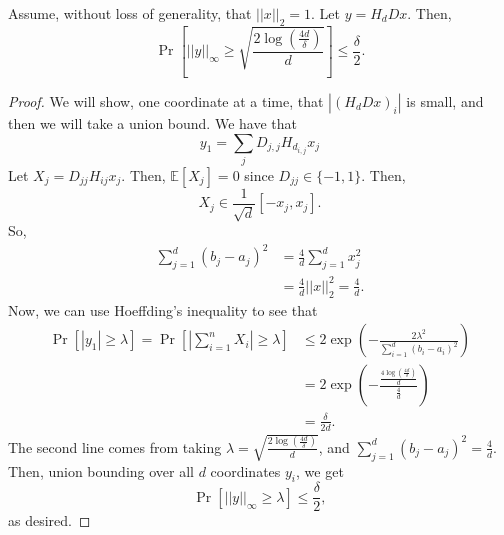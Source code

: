         \begin{lemma*}
            Assume, without loss of generality, that \(||x||_2=1\). Let \(y=H_dDx\). Then,
            \begin{equation*}
                \Pr\left[||y||_\infty\geq \sqrt{\frac{2\log(\frac{4d}{\delta})}{d}}\right]\leq\frac{\delta}{2}.
            \end{equation*}
            \begin{proof}
                We will show, one coordinate at a time, that \(|(H_dDx)_i|\) is small, and then we will take a union bound. We have that
                \begin{equation*}
                    y_1=\sum_{j}D_{j,j}H_{d_{i,j}}x_j
                \end{equation*}
                Let \(X_j=D_{jj}H_{ij}x_j\). Then, \(\mathbb{E}[X_j]=0\) since \(D_{jj}\in\{-1,1\}\). Then,
                \begin{equation*}
                    X_j\in\frac{1}{\sqrt{d}}[-x_j,x_j].
                \end{equation*}
                So,
                \begin{align*}
                    \sum_{j=1}^d (b_j-a_j)^2&=\frac{4}{d}\sum_{j=1}^d x_j^2 \\
                    &=\frac{4}{d}||x||_2^2=\frac{4}{d}.
                \end{align*}
                Now, we can use Hoeffding's inequality to see that
                \begin{align*}
                    \Pr[|y_1|\geq\lambda]=\Pr\left[\left|\sum_{i=1}^n X_i \right|\geq\lambda\right]&\leq 2\exp\left(-\frac{2\lambda^2}{\sum_{i=1}^d(b_i-a_i)^2}\right) \\
                    &=2\exp\left(-\frac{\frac{4\log(\frac{4d}{\delta})}{d}}{\frac{4}{d}}\right) \\
                    &=\frac{\delta}{2d}.
                \end{align*}
                The second line comes from taking \(\lambda=\sqrt{\frac{2\log\left(\frac{4d}{\delta}\right)}{d}}\), and \(\sum_{j=1}^d(b_j-a_j)^2=\frac{4}{d}\). Then, union bounding over all \(d\) coordinates \(y_i\), we get
                \begin{equation*}
                    \Pr[||y||_\infty\geq\lambda]\leq\frac{\delta}{2},
                \end{equation*}
                as desired.
            \end{proof}
        \end{lemma*}
